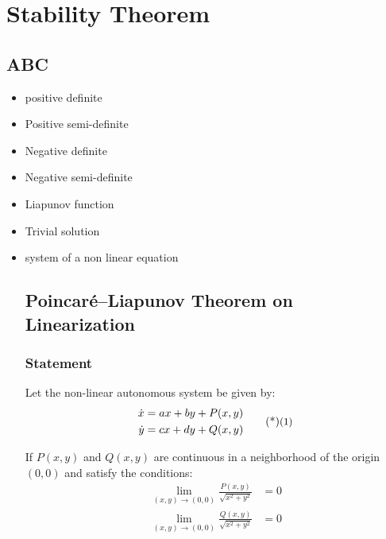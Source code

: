 \chapter{Stability Theorem}
\section*{ABC}
\begin{itemize}
    \item positive definite
    \item Positive semi-definite
    \item Negative definite
    \item Negative semi-definite
    \item Liapunov function
    \item Trivial solution
    \item system of a non linear equation
    \section*{Poincaré–Liapunov Theorem on Linearization}

\subsection*{Statement}

Let the non-linear autonomous system be given by:
\begin{equation}
    \begin{aligned}
        \dot{x} &= ax + by + P(x, y) \\
        \dot{y} &= cx + dy + Q(x, y)
    \end{aligned} \sidenote{1}
\end{equation}

If $P(x, y)$ and $Q(x, y)$ are continuous in a neighborhood of the origin $(0,0)$ and satisfy the conditions:
\begin{align*}
    \lim_{(x, y) \to (0,0)} \frac{P(x, y)}{\sqrt{x^2 + y^2}} &= 0 \\[0.5em]
    \lim_{(x, y) \to (0,0)} \frac{Q(x, y)}{\sqrt{x^2 + y^2}} &= 0
\end{align*}


\end{itemize}

